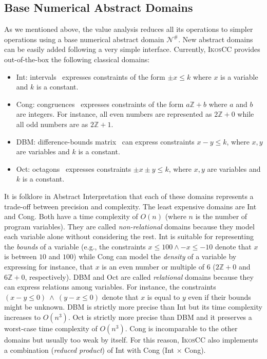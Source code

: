 \documentclass[a4]{article}
\newcommand{\ikoscc}{\textsc{IkosCC}\xspace}
\begin{document}
\subsection{Base Numerical Abstract Domains}


As we mentioned above, the value analysis reduces all its operations
to simpler operations using a base numerical abstract domain
$\mathcal{N}^{\#}$. New abstract domains can be easily added following
a very simple interface. Currently, \ikoscc provides out-of-the-box
the following classical domains:

\begin{itemize}

\item Int: intervals~\cite{intervals} expresses constraints of the
  form $\pm x \leq k$ where $ x$ is a variable and $k$ is a constant.

\item Cong: congruences~\cite{congruences} expresses constraints of
  the form $a\mathbb{Z} + b$ where $a$ and $b$ are integers. For
  instance, all even numbers are represented as $2\mathbb{Z} + 0$
  while all odd numbers are as $2\mathbb{Z} + 1$.

\item DBM: difference-bounds matrix~\cite{dbm} can express constraints
  $x - y \leq k$, where $x,y$ are variables and $k$ is a constant.

\item Oct: octagons~\cite{octagons} expresses constraints $\pm x \pm y
  \leq k$, where $x,y$ are variables and $k$ is a constant.

\end{itemize}

It is folklore in Abstract Interpretation that each of these domains
represents a trade-off between precision and complexity. The least
expensive domains are Int and Cong. Both have a time complexity of
$O(n)$ (where $n$ is the number of program variables). They are called
\emph{non-relational} domains because they model each variable alone
without considering the rest. Int is suitable for representing the
\emph{bounds} of a variable (e.g., the constraints $x \leq 100 \wedge
-x \leq -10$ denote that $x$ is between $10$ and $100$) while Cong can
model the \emph{density} of a variable by expressing for instance,
that $x$ is an even number or multiple of $6$ ($2\mathbb{Z} + 0$ and
$6\mathbb{Z} + 0$, respectively). DBM and Oct are called
\emph{relational} domains because they can express relations among
variables. For instance, the constraints $(x - y \leq 0)~ \wedge~ (y -
x \leq 0)$ denote that $x$ is equal to $y$ even if their bounds might
be unknown. DBM is strictly more precise than Int but its time
complexity increases to $O(n^{3})$. Oct is strictly more precise than
DBM and it preserves a worst-case time complexity of $O(n^{3})$. Cong
is incomparable to the other domains but usually too weak by
itself. For this reason, \ikoscc also implements a combination
(\emph{reduced product}) of Int with Cong (Int $\times$ Cong).
\end{document}
